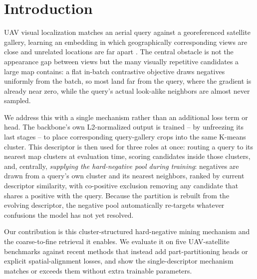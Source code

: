 \documentclass[conference]{IEEEtran}
\begin{document}
\section{Introduction}
UAV visual localization matches an aerial query against a georeferenced
satellite gallery, learning an embedding in which geographically
corresponding views are close and unrelated locations are far apart
\cite{hadsell2006dimensionality,schroff2015facenet}. The central obstacle
is not the appearance gap between views but the many visually repetitive
candidates a large map contains: a flat in-batch contrastive objective
draws negatives uniformly from the batch, so most land far from the
query, where the gradient is already near zero, while the query's actual
look-alike neighbors are almost never sampled.

We address this with a single mechanism rather than an additional loss
term or head. The backbone's own L2-normalized output is trained -- by
unfreezing its last stages -- to place corresponding query-gallery crops
into the same K-means cluster. This descriptor is then used for three
roles at once: routing a query to its nearest map clusters at evaluation
time, scoring candidates inside those clusters, and, centrally,
\emph{supplying the hard-negative pool during training}: negatives are
drawn from a query's own cluster and its nearest neighbors, ranked by
current descriptor similarity, with co-positive exclusion removing any
candidate that shares a positive with the query. Because the partition is
rebuilt from the evolving descriptor, the negative pool automatically
re-targets whatever confusions the model has not yet resolved.

Our contribution is this cluster-structured hard-negative mining
mechanism and the coarse-to-fine retrieval it enables. We evaluate it on
five UAV-satellite benchmarks against recent methods that instead add
part-partitioning heads or explicit spatial-alignment losses, and show
the single-descriptor mechanism matches or exceeds them without extra
trainable parameters.
\end{document}
